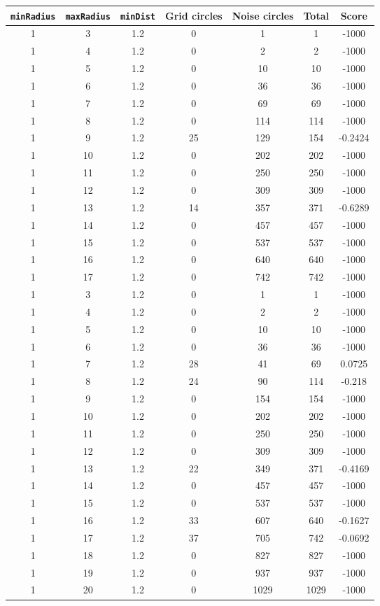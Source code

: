 \documentclass[letterpaper, 12pt]{article}
\begin{document}
\begin{longtable}{|c|c|c|c|c|c|c|}
\hline
\textbf{\texttt{minRadius}} & \textbf{\texttt{maxRadius}} & \textbf{\texttt{minDist}} & \textbf{Grid circles} & \textbf{Noise circles} & \textbf{Total} & \textbf{Score} \\
\hline
1 & 3 & 1.2 & 0 & 1 & 1 & -1000 \\
\hline
1 & 4 & 1.2 & 0 & 2 & 2 & -1000 \\
\hline
1 & 5 & 1.2 & 0 & 10 & 10 & -1000 \\
\hline
1 & 6 & 1.2 & 0 & 36 & 36 & -1000 \\
\hline
1 & 7 & 1.2 & 0 & 69 & 69 & -1000 \\
\hline
1 & 8 & 1.2 & 0 & 114 & 114 & -1000 \\
\hline
1 & 9 & 1.2 & 25 & 129 & 154 & -0.2424 \\
\hline
1 & 10 & 1.2 & 0 & 202 & 202 & -1000 \\
\hline
1 & 11 & 1.2 & 0 & 250 & 250 & -1000 \\
\hline
1 & 12 & 1.2 & 0 & 309 & 309 & -1000 \\
\hline
1 & 13 & 1.2 & 14 & 357 & 371 & -0.6289 \\
\hline
1 & 14 & 1.2 & 0 & 457 & 457 & -1000 \\
\hline
1 & 15 & 1.2 & 0 & 537 & 537 & -1000 \\
\hline
1 & 16 & 1.2 & 0 & 640 & 640 & -1000 \\
\hline
1 & 17 & 1.2 & 0 & 742 & 742 & -1000 \\
\hline
1 & 3 & 1.2 & 0 & 1 & 1 & -1000 \\
\hline
1 & 4 & 1.2 & 0 & 2 & 2 & -1000 \\
\hline
1 & 5 & 1.2 & 0 & 10 & 10 & -1000 \\
\hline
1 & 6 & 1.2 & 0 & 36 & 36 & -1000 \\
\hline
1 & 7 & 1.2 & 28 & 41 & 69 & 0.0725 \\
\hline
1 & 8 & 1.2 & 24 & 90 & 114 & -0.218 \\
\hline
1 & 9 & 1.2 & 0 & 154 & 154 & -1000 \\
\hline
1 & 10 & 1.2 & 0 & 202 & 202 & -1000 \\
\hline
1 & 11 & 1.2 & 0 & 250 & 250 & -1000 \\
\hline
1 & 12 & 1.2 & 0 & 309 & 309 & -1000 \\
\hline
1 & 13 & 1.2 & 22 & 349 & 371 & -0.4169 \\
\hline
1 & 14 & 1.2 & 0 & 457 & 457 & -1000 \\
\hline
1 & 15 & 1.2 & 0 & 537 & 537 & -1000 \\
\hline
1 & 16 & 1.2 & 33 & 607 & 640 & -0.1627 \\
\hline
1 & 17 & 1.2 & 37 & 705 & 742 & -0.0692 \\
\hline
1 & 18 & 1.2 & 0 & 827 & 827 & -1000 \\
\hline
1 & 19 & 1.2 & 0 & 937 & 937 & -1000 \\
\hline
1 & 20 & 1.2 & 0 & 1029 & 1029 & -1000 \\
\hline
\end{longtable}
\end{document}

